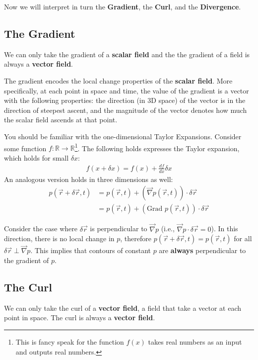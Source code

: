Now we will interpret in turn the \textbf{Gradient}, the \textbf{Curl}, and the \textbf{Divergence}.

\subsection{The Gradient}

We can only take the gradient of a \textbf{scalar field} and the the gradient of a field is always a \textbf{vector field}.

The gradient encodes the local change properties of the \textbf{scalar field}. More specifically, at each point in space and time, the value of the gradient is a vector with the following properties: the direction (in 3D space) of the vector is in the direction of steepest ascent, and the magnitude of the vector denotes how much the scalar field ascends at that point.

You should be familiar with the one-dimensional Taylor Expansions. Consider some function $f: \mathbb{R} \to \mathbb{R}$\footnote{This is fancy speak for the function $f(x)$ takes real numbers as an input and outputs real numbers.}. The following holds expresses the Taylor expansion, which holds for small $\delta x$:
\begin{align*}
    f(x+\delta x)=f(x)+\frac{df}{dx}\delta x
\end{align*}
An analogous version holds in three dimensions as well:
\begin{align*}
    p(\vec{r}+\delta\vec{r},t)&=p(\vec{r},t)+\left( \vec{\nabla}p(\vec{r},t) \right)\cdot \delta\vec{r}\\
    &=p(\vec{r},t)+\left( \text{Grad }p(\vec{r},t) \right)\cdot \delta\vec{r}
\end{align*}

Consider the case where $\delta \vec{r}$ is perpendicular to $\vec{\nabla}p$ (i.e., $\vec{\nabla}p\cdot \delta \vec{r}=0$). In this direction, there is no local change in $p$, therefore $p(\vec{r}+\delta\vec{r},t)=p(\vec{r},t)$ for all $\delta\vec{r}\perp \vec{\nabla}p$. This implies that contours of constant $p$ are \textbf{always} perpendicular to the gradient of $p$. 

\subsection{The Curl}

We can only take the curl of a \textbf{vector field}, a field that take a vector at each point in space. The curl is always a \textbf{vector field}.

